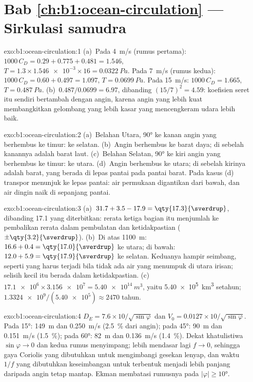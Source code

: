 \section*{Bab \ref{ch:b1:ocean-circulation} --- Sirkulasi samudra}

\begin{solution}{exo:b1:ocean-circulation:1}
(a)~Pada \qty{4}{m/s} (rumus pertama): $1000\,C_D = 0.29 + 0.775 + 0.481 = 1.546$,
$T = 1.3 \times \num{1.546e-3} \times 16 = \qty{0.0322}{Pa}$. Pada \qty{7}{m/s}
(rumus kedua): $1000\,C_D = 0.60 + 0.497 = 1.097$, $T = \qty{0.0699}{Pa}$. Pada
\qty{15}{m/s}: $1000\,C_D = 1.665$, $T = \qty{0.487}{Pa}$. (b)~$0.487/0.0699 =
6.97$, dibanding $(15/7)^2 = 4.59$: koefisien seret itu sendiri bertambah dengan angin,
karena angin yang lebih kuat membangkitkan gelombang yang lebih kasar yang mencengkeram udara lebih baik.
\end{solution}

\begin{solution}{exo:b1:ocean-circulation:2}
(a)~Belahan Utara, \ang{90} ke kanan angin yang berhembus ke timur: ke selatan. (b)~Angin
berhembus ke barat daya; di sebelah kanannya adalah barat laut. (c)~Belahan Selatan, \ang{90} ke kiri angin yang berhembus ke timur:
ke utara. (d)~Angin berhembus ke utara; di sebelah kirinya adalah barat, yang berada di lepas pantai pada pantai barat. Pada kasus (d) transpor menunjuk ke lepas pantai:
air permukaan digantikan dari bawah, dan air dingin naik di sepanjang pantai.
\end{solution}

\begin{solution}{exo:b1:ocean-circulation:3}
(a)~$31.7 + 3.5 - 17.9 = \qty{17.3}{\sverdrup}$, dibanding \qty{17.1}{\sverdrup} yang diterbitkan:
rerata ketiga bagian itu menjumlah ke pembalikan rerata dalam pembulatan dan ketidakpastian ($\pm\qty{3.2}{\sverdrup}$).
(b)~Di atas \qty{1100}{m}: $16.6 + 0.4 = \qty{17.0}{\sverdrup}$ ke utara; di bawah:
$12.0 + 5.9 = \qty{17.9}{\sverdrup}$ ke selatan. Keduanya hampir seimbang, seperti yang harus terjadi
bila tidak ada air yang menumpuk di utara irisan; selisih kecil itu berada dalam ketidakpastian. (c)~$\num{17.1e6} \times \num{3.156e7} = \qty{5.40e14}{m^3}$, yaitu
\qty{5.40e5}{km^3} setahun; $\num{1.3324e9}/(\num{5.40e5}) \approx 2470$ tahun.
\end{solution}

\begin{solution}{exo:b1:ocean-circulation:4}
$D_E = 7.6 \times 10/\sqrt{\sin\varphi}$ dan $V_0 = 0.0127 \times
10/\sqrt{\sin\varphi}$. Pada \ang{15}: \qty{149}{m} dan \qty{0.250}{m/s}
(\qty{2.5}{\percent} dari angin); pada \ang{45}: \qty{90}{m} dan \qty{0.151}{m/s}
(\qty{1.5}{\percent}); pada \ang{60}: \qty{82}{m} dan \qty{0.136}{m/s}
(\qty{1.4}{\percent}). Dekat khatulistiwa $\sin\varphi \to 0$ dan kedua rumus menyimpang; lebih mendasar lagi $f \to 0$, sehingga gaya Coriolis yang dibutuhkan untuk mengimbangi gesekan lenyap, dan waktu $1/f$ yang dibutuhkan keseimbangan untuk terbentuk menjadi lebih panjang daripada angin tetap mantap. Ekman membatasi rumusnya pada $|\varphi| \geq
\ang{10}$.
\end{solution}

